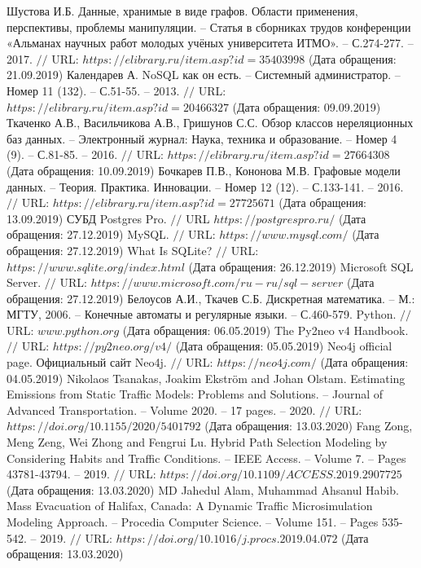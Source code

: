 \begin{thebibliography}{00}
	Шустова И.Б. Данные, хранимые в виде графов. Области применения, перспективы, проблемы манипуляции. -- Статья в сборниках трудов конференции «Альманах научных работ молодых учёных университета ИТМО». -- С.274-277. -- 2017. $//$ URL: $https://elibrary.ru/item.asp?id=35403998$ (Дата обращения: 21.09.2019)
	Календарев А. NoSQL как он есть. -- Системный администратор. -- Номер 11 (132). -- С.51-55. -- 2013. $//$ URL: $https://elibrary.ru/item.asp?id=20466327$ (Дата обращения: 09.09.2019)
	Ткаченко А.В., Васильчикова А.В., Гришунов С.С. Обзор классов нереляционных баз данных. -- Электронный журнал: Наука, техника и образование. -- Номер 4 (9). -- С.81-85. -- 2016. $//$ URL: $https://elibrary.ru/item.asp?id=27664308$ (Дата обращения: 10.09.2019)
	Бочкарев П.В., Кононова М.В. Графовые модели данных. -- Теория. Практика. Инновации. -- Номер 12 (12). -- С.133-141. -- 2016. $//$ URL: $https://elibrary.ru/item.asp?id=27725671$ (Дата обращения: 13.09.2019)
	СУБД Postgres Pro. $//$ URL $https://postgrespro.ru/$ (Дата обращения: 27.12.2019)
	MySQL. $//$ URL: $https://www.mysql.com/$ (Дата обращения: 27.12.2019)
	What Is SQLite? $//$ URL: $https://www.sqlite.org/index.html$ (Дата обращения: 26.12.2019)
	Microsoft SQL Server. $//$ URL: $https://www.microsoft.com/ru-ru/sql-server$ (Дата обращения: 27.12.2019)
	Белоусов А.И., Ткачев С.Б. Дискретная математика. -- М.: МГТУ, 2006. -- Конечные автоматы и регулярные языки. -- С.460-579.
	Python. $//$ URL: $www.python.org$ (Дата обращения: 06.05.2019)
	The Py2neo v4 Handbook. $//$ URL: $https://py2neo.org/v4/$ (Дата обращения: 05.05.2019)
	Neo4j official page. Официальный сайт Neo4j. $//$ URL: $https://neo4j.com/$ (Дата обращения: 04.05.2019)
	Nikolaos Tsanakas, Joakim Ekström and Johan Olstam. Estimating Emissions from Static Traffic Models: Problems and Solutions. -- Journal of Advanced Transportation. -- Volume 2020. -- 17 pages. -- 2020. $//$ URL: $https://doi.org/10.1155/2020/5401792$ (Дата обращения: 13.03.2020)
	Fang Zong, Meng Zeng, Wei Zhong and Fengrui Lu. Hybrid Path Selection Modeling by Considering Habits and Traffic Conditions. -- IEEE Access. -- Volume 7. -- Pages 43781-43794. -- 2019. $//$ URL: $https://doi.org/10.1109/ACCESS.2019.2907725$ (Дата обращения: 13.03.2020)
	MD Jahedul Alam, Muhammad Ahsanul Habib. Mass Evacuation of Halifax, Canada: A Dynamic Traffic Microsimulation Modeling Approach. -- Procedia Computer Science. -- Volume 151. -- Pages 535-542. -- 2019. $//$ URL: $https://doi.org/10.1016/j.procs.2019.04.072$ (Дата обращения: 13.03.2020)

\end{thebibliography}
